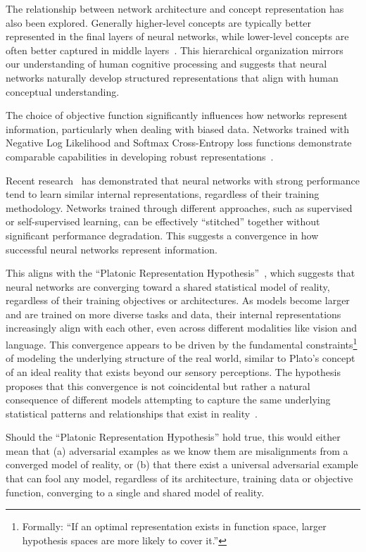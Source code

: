 \documentclass[a4paper, oneside]{discothesis}
\begin{document}
The relationship between network architecture and concept representation has also been explored. Generally higher-level concepts are typically better represented in the final layers of neural networks, while lower-level concepts are often better captured in middle layers~\cite{Agafonov2022AnEO, Agafonov2022LocalizationOO}. This hierarchical organization mirrors our understanding of human cognitive processing and suggests that neural networks naturally develop structured representations that align with human conceptual understanding.

The choice of objective function significantly influences how networks represent information, particularly when dealing with biased data. Networks trained with Negative Log Likelihood and Softmax Cross-Entropy loss functions demonstrate comparable capabilities in developing robust representations~\cite{bangaru2022interpreting}.

Recent research~\cite{bansal2021revisiting} has demonstrated that neural networks with strong performance tend to learn similar internal representations, regardless of their training methodology. Networks trained through different approaches, such as supervised or self-supervised learning, can be effectively ``stitched'' together without significant performance degradation. This suggests a convergence in how successful neural networks represent information.

This aligns with the ``Platonic Representation Hypothesis''~\cite{huh2024platonic}, which suggests that neural networks are converging toward a shared statistical model of reality, regardless of their training objectives or architectures. As models become larger and are trained on more diverse tasks and data, their internal representations increasingly align with each other, even across different modalities like vision and language. This convergence appears to be driven by the fundamental constraints\footnote{Formally: ``If an optimal representation exists in function space, larger hypothesis spaces are more likely to cover it.''} of modeling the underlying structure of the real world, similar to Plato's concept of an ideal reality that exists beyond our sensory perceptions. The hypothesis proposes that this convergence is not coincidental but rather a natural consequence of different models attempting to capture the same underlying statistical patterns and relationships that exist in reality~\cite{huh2024platonic}. 

Should the ``Platonic Representation Hypothesis'' hold true, this would either mean that (a) adversarial examples as we know them are misalignments from a converged model of reality, or (b) that there exist a universal adversarial example that can fool any model, regardless of its architecture, training data or objective function, converging to a single and shared model of reality.
\end{document}
